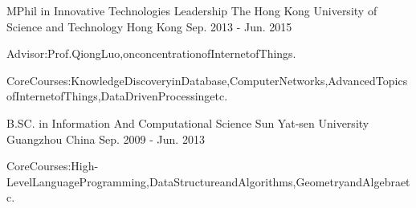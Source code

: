 

\begin{cventries}

  \cventry
    {MPhil in Innovative Technologies Leadership} %
    {The Hong Kong University of Science and Technology} %
    {Hong Kong} %
    {Sep. 2013 - Jun. 2015} %
    {
      \begin{cvitems} %
        \item {Advisor:Prof.QiongLuo,onconcentrationofInternetofThings.}
        \item {CoreCourses:KnowledgeDiscoveryinDatabase,ComputerNetworks,AdvancedTopicsofInternetofThings,DataDrivenProcessingetc.}
      \end{cvitems}
    }

  \cventry
  {B.SC. in Information And Computational Science} %
  {Sun Yat-sen University} %
  {Guangzhou China} %
  {Sep. 2009 - Jun. 2013} %
  {
    \begin{cvitems} %
      \item {CoreCourses:High-LevelLanguageProgramming,DataStructureandAlgorithms,GeometryandAlgebraetc.}
    \end{cvitems}
  }

\end{cventries}
